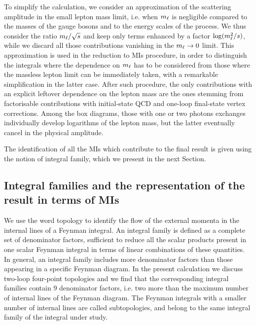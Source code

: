 \documentclass[11pt,a4paper]{article}
\begin{document}
To simplify the calculation,
we consider an approximation of the scattering amplitude in the small lepton mass limit,
i.e. when $m_\ell$ is negligible compared
to the masses of the gauge bosons and to the energy scales of the process.
We thus consider the ratio $m_\ell/\sqrt{s}$
and keep only terms enhanced by a factor $\log(m_\ell^2/s)$,
while we discard all those contributions vanishing in the $m_\ell\to 0$ limit.
This approximation is used in the reduction to MIs procedure,
in order to distinguish the integrals where the dependence on $m_\ell$ has to be considered
from those where the massless lepton limit can be immediately taken,
with a remarkable simplification in the latter case.
After such procedure,
the only contributions with an explicit leftover dependence on the lepton mass
are the ones stemming from factorisable contributions with initial-state QCD and
one-loop final-state vertex corrections.
Among the box diagrams, those with one or two photons exchanges
individually develop logarithms of the lepton mass,
but the latter eventually cancel \cite{Frenkel:1976bj}
in the physical amplitude.

The identification of all the MIs which contribute to the final result
is given
using the notion of integral family, which we present in the next Section.



\subsection{Integral families and the representation of the result in terms of MIs}
%
We use the word topology to identify the flow of the external momenta
in the internal lines of a Feynman integral.
An integral family is defined as a complete set of denominator factors,
sufficient to reduce all the scalar products present in one scalar Feynman integral
in terms of linear combinations of these quantities.
In general, an integral family includes more denominator factors
than those appearing in a specific Feynman diagram.
In the present calculation we discuss two-loop four-point topologies
and we find that the corresponding integral families contain 9 denominator factors,
i.e. two more than the maximum number of internal lines of the Feynman diagram.
The Feynman integrals with a smaller number of internal lines
are called subtopologies, and belong to the same integral family of the
integral under study.
\end{document}
